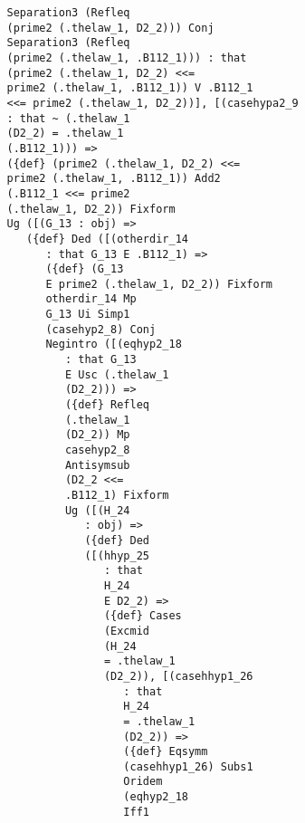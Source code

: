 \documentclass[12pt]{article}
\begin{document}
\begin{verbatim}
                      Separation3 (Refleq 
                      (prime2 (.thelaw_1, D2_2))) Conj 
                      Separation3 (Refleq 
                      (prime2 (.thelaw_1, .B112_1))) : that 
                      (prime2 (.thelaw_1, D2_2) <<= 
                      prime2 (.thelaw_1, .B112_1)) V .B112_1 
                      <<= prime2 (.thelaw_1, D2_2))], [(casehypa2_9 
                      : that ~ (.thelaw_1 
                      (D2_2) = .thelaw_1 
                      (.B112_1))) => 
                      ({def} (prime2 (.thelaw_1, D2_2) <<= 
                      prime2 (.thelaw_1, .B112_1)) Add2 
                      (.B112_1 <<= prime2 
                      (.thelaw_1, D2_2)) Fixform 
                      Ug ([(G_13 : obj) => 
                         ({def} Ded ([(otherdir_14 
                            : that G_13 E .B112_1) => 
                            ({def} (G_13 
                            E prime2 (.thelaw_1, D2_2)) Fixform 
                            otherdir_14 Mp 
                            G_13 Ui Simp1 
                            (casehyp2_8) Conj 
                            Negintro ([(eqhyp2_18 
                               : that G_13 
                               E Usc (.thelaw_1 
                               (D2_2))) => 
                               ({def} Refleq 
                               (.thelaw_1 
                               (D2_2)) Mp 
                               casehyp2_8 
                               Antisymsub 
                               (D2_2 <<= 
                               .B112_1) Fixform 
                               Ug ([(H_24 
                                  : obj) => 
                                  ({def} Ded 
                                  ([(hhyp_25 
                                     : that 
                                     H_24 
                                     E D2_2) => 
                                     ({def} Cases 
                                     (Excmid 
                                     (H_24 
                                     = .thelaw_1 
                                     (D2_2)), [(casehhyp1_26 
                                        : that 
                                        H_24 
                                        = .thelaw_1 
                                        (D2_2)) => 
                                        ({def} Eqsymm 
                                        (casehhyp1_26) Subs1 
                                        Oridem 
                                        (eqhyp2_18 
                                        Iff1 

\end{verbatim}
\end{document}
